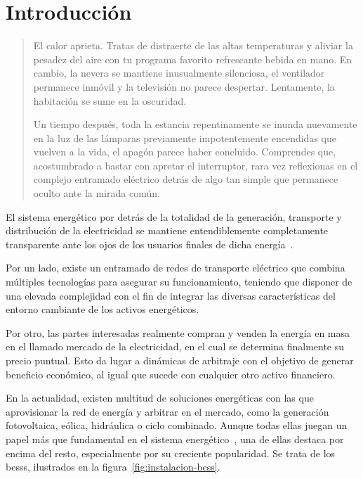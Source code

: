 \cleardoublepage

\chapter{Introducción}
\label{makereference1}

\begin{quotation}

  El calor aprieta. Tratas de distraerte de las altas temperaturas y aliviar la pesadez del aire con tu programa favorito refrescante bebida en mano. En cambio, la nevera se mantiene inusualmente silenciosa, el ventilador permanece inmóvil y la televisión no parece despertar. Lentamente, la habitación se sume en la oscuridad.

  Un tiempo después, toda la estancia repentinamente se inunda nuevamente en la luz de las lámparas previamente impotentemente encendidas que vuelven a la vida, el apagón parece haber concluido. Comprendes que, acostumbrado a bastar con apretar el interruptor, rara vez reflexionas en el complejo entramado eléctrico detrás de algo tan simple que permanece oculto ante la mirada común.

\end{quotation}

El sistema energético por detrás de la totalidad de la generación, transporte y distribución de la electricidad se mantiene entendiblemente completamente transparente ante los ojos de los usuarios finales de dicha energía~\cite{garrues2009red}.

Por un lado, existe un entramado de redes de transporte eléctrico que combina múltiples tecnologías para asegurar su funcionamiento, teniendo que disponer de una elevada complejidad con el fin de integrar las diversas características del entorno cambiante de los activos energéticos.

Por otro, las partes interesadas realmente compran y venden la energía en masa en el llamado mercado de la electricidad, en el cual se determina finalmente su precio puntual. Esto da lugar a dinámicas de arbitraje con el objetivo de generar beneficio económico, al igual que sucede con cualquier otro activo financiero.

En la actualidad, existen multitud de soluciones energéticas con las que aprovisionar la red de energía y arbitrar en el mercado, como la generación fotovoltaica, eólica, hidráulica o ciclo combinado. Aunque todas ellas juegan un papel más que fundamental en el sistema energético~\cite{turkenburg2000renewable}, una de ellas destaca por encima del resto, especialmente por su creciente popularidad. Se trata de los \glspl{bess}, ilustrados en la figura~\ref{fig:instalacion-bess}.

